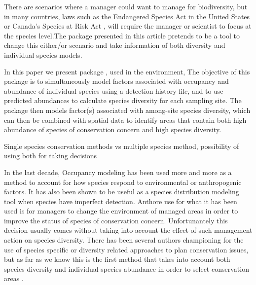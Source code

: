 \documentclass[article]{jss}
\begin{document}
There are scenarios where a manager could want to manage for
biodiversity, but in many countries, laws such as the Endangered Species
Act in the United States or Canada's Species at Risk Act
\citep{congress1973endangered, waples2013tale}, will require the manager
or scientist to focus at the species level.The package presented in this
article pretends to be a tool to change this either/or scenario and take
information of both diversity and individual species models.

In this paper we present package , used in the
 environment, The objective of this package is to
simultaneously model factors associated with occupancy and abundance of
individual species using a detection history file, and to use predicted
abundances to calculate species diversity for each sampling site. The
package then models factor(s) associated with among-site species
diversity, which can then be combined with spatial data to identify
areas that contain both high abundance of species of conservation
concern and high species diversity.

Single species conservation methods vs multiple species method,
possibility of using both for taking decisions

In the last decade, Occupancy modeling has been used more and more as a
method to account for how species respond to environmental or
anthropogenic factors. It has also been shown to be useful as a species
distribution modeling tool when species have imperfect detection.
Anthore use for what it has been used is for managers to change the
environment of managed areas in order to improve the status of species
of conservation concern. Unfortunantely this decision usually comes
without taking into account the effect of such management action on
species diversity. There has been several authors championing for the
use of species specific or diversity related approaches to plan
conservation issues, \citep{mackenzie_estimating_2002} but as far as we
know this is the first method that takes into account both species
diversity and individual species abundance in order to select
conservation areas \citep{mackenzie_estimating_2002}.
\end{document}
